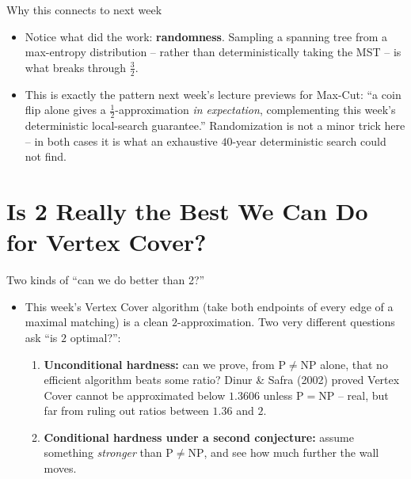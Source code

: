\documentclass[11pt,aspectratio=169]{beamer}
\begin{document}
\begin{frame}{Why this connects to next week}
  \begin{itemize}
    \item Notice what did the work: \textbf{randomness}. Sampling a spanning tree from a
    max-entropy distribution -- rather than deterministically taking the MST -- is what
    breaks through $\tfrac32$.
    \item This is exactly the pattern next week's lecture previews for Max-Cut: ``a coin
    flip alone gives a $\tfrac12$-approximation \emph{in expectation}, complementing this
    week's deterministic local-search guarantee.'' Randomization is not a minor trick
    here -- in both cases it is what an exhaustive $40$-year deterministic search could
    not find.
  \end{itemize}
\end{frame}

\section{Is 2 Really the Best We Can Do for Vertex Cover?}

\begin{frame}{Two kinds of ``can we do better than 2?''}
  \begin{itemize}
    \item This week's Vertex Cover algorithm (take both endpoints of every edge of a
    maximal matching) is a clean $2$-approximation. Two very different questions ask
    ``is $2$ optimal?'':
    \begin{enumerate}
      \item \textbf{Unconditional hardness:} can we prove, from $\mathrm{P}\ne\mathrm{NP}$
      alone, that no efficient algorithm beats some ratio? Dinur \& Safra (2002) proved
      Vertex Cover cannot be approximated below $1.3606$ unless $\mathrm{P}=\mathrm{NP}$
      -- real, but far from ruling out ratios between $1.36$ and $2$.
      \item \textbf{Conditional hardness under a second conjecture:} assume something
      \emph{stronger} than $\mathrm{P}\ne\mathrm{NP}$, and see how much further the wall
      moves.
    \end{enumerate}
  \end{itemize}
\end{frame}
\end{document}
